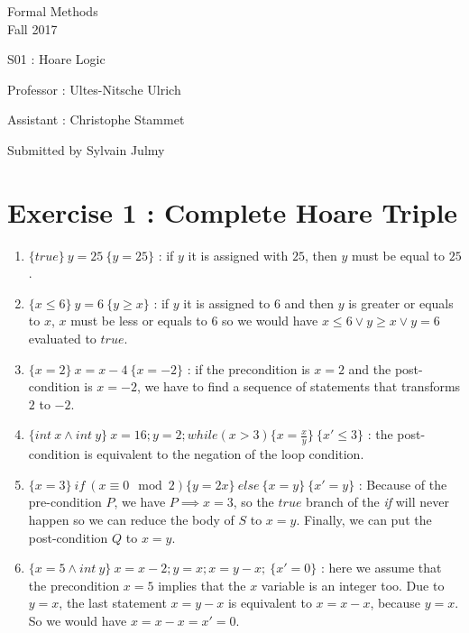 \documentclass[a4paper,11pt]{report}
\author{Sylvain Julmy}
\date{\today}
\begin{document}
\begin{center}
  \large{
    Formal Methods\\
    Fall 2017
  }
  
  \noindent\makebox[\linewidth]{\rule{\linewidth}{0.4pt}}
  S01 : Hoare Logic
  \noindent\makebox[\linewidth]{\rule{\linewidth}{0.4pt}}

  \begin{flushleft}
    Professor : Ultes-Nitsche Ulrich

    Assistant : Christophe Stammet
  \end{flushleft}

  \noindent\makebox[\linewidth]{\rule{\linewidth}{0.4pt}}

  Submitted by Sylvain Julmy
  
  \noindent\makebox[\linewidth]{\rule{\textwidth}{1pt}}
\end{center}

\section*{Exercise 1 : Complete Hoare Triple}

\begin{enumerate}
\item $\{true\} \ y = 25 \ \{y = 25\}$ : if $y$ it is assigned with $25$, then $y$
  must be equal to $25$.
\item $\{x \leq 6\} \ y = 6 \ \{y \geq x\}$ : if $y$ it is assigned to $6$ and then
  $y$ is greater or equals to $x$, $x$ must be less or equals to $6$ so we would
  have $x \leq 6 \vee y \geq x \vee y = 6$ evaluated to $true$.
\item $\{x=2\} \ x = x - 4 \ \{x=-2\}$ : if the precondition is $x=2$ and the
  post-condition is $x=-2$, we have to find a sequence of statements that
  transforms $2$ to $-2$.
\item $\{int\ x \wedge int\ y\} \ x=16;y=2;while(x > 3)\{x = \frac{x}{y}\} \ \{x'
  \leq 3\}$ : the post-condition is equivalent to the negation of the
  loop condition.
\item $\{x = 3\} \ if\ (x \equiv 0 \mod 2)\{y=2x\}\ else\ \{x=y\} \ \{x' = y\}$ :
  Because of the pre-condition $P$, we have $P \implies x = 3$, so the $true$
  branch of the \textit{if} will never happen so we can reduce the body of $S$
  to $x = y$. Finally, we can put the post-condition $Q$ to $x = y$.
\item $\{x=5 \wedge int\ y \} \ x = x-2; y = x; x=y-x; \ \{x' = 0\}$ : here we
  assume that the precondition $x=5$ implies that the $x$ variable is an
  integer too. Due to $y = x$, the last statement $x = y - x$ is equivalent to
  $x = x - x$, because $y = x$. So we would have $x = x - x = x' = 0$.
\end{enumerate}
\end{document}
